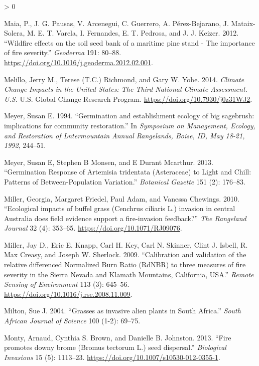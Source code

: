 \documentclass[
  12pt,
]{article}
\newlength{\cslhangindent}
\newenvironment{CSLReferences}[2] %
 {%
  \setlength{\parindent}{0pt}
  \ifodd #1 \everypar{\setlength{\hangindent}{\cslhangindent}}\ignorespaces\fi
  \ifnum #2 > 0
  \setlength{\parskip}{#2\baselineskip}
  \fi
 }%
 {}
\begin{document}
\begin{CSLReferences}{1}{0}
\leavevmode\hypertarget{ref-Maia2012}{}%
Maia, P., J. G. Pausas, V. Arcenegui, C. Guerrero, A. Pérez-Bejarano, J.
Mataix-Solera, M. E. T. Varela, I. Fernandes, E. T. Pedrosa, and J. J.
Keizer. 2012. {``{Wildfire effects on the soil seed bank of a maritime
pine stand - The importance of fire severity}.''} \emph{Geoderma} 191:
80--88. \url{https://doi.org/10.1016/j.geoderma.2012.02.001}.

\leavevmode\hypertarget{ref-Melillo2014}{}%
Melillo, Jerry M., Terese (T.C.) Richmond, and Gary W. Yohe. 2014.
\emph{Climate {Change} {Impacts} in the {United} {States}: {The} {Third}
{National} {Climate} {Assessment}. {U}.{S}.} U.S. Global Change Research
Program. \url{https://doi.org/10.7930/j0z31WJ2}.

\leavevmode\hypertarget{ref-Meyer1994}{}%
Meyer, Susan E. 1994. {``{Germination and establishment ecology of big
sagebrush: implications for community restoration}.''} In
\emph{Symposium on Management, Ecology, and Restoration of Lntermountain
Annual Rangelands, Boise, ID, May 18-21, 1992}, 244--51.

\leavevmode\hypertarget{ref-Meyer2013}{}%
Meyer, Susan E, Stephen B Monsen, and E Durant Mcarthur. 2013.
{``{Germination Response of Artemisia tridentata (Asteraceae) to Light
and Chill: Patterns of Between-Population Variation}.''} \emph{Botanical
Gazette} 151 (2): 176--83.

\leavevmode\hypertarget{ref-Miller2010}{}%
Miller, Georgia, Margaret Friedel, Paul Adam, and Vanessa Chewings.
2010. {``{Ecological impacts of buffel grass (Cenchrus ciliaris L.)
invasion in central Australia does field evidence support a
fire-invasion feedback?}''} \emph{The Rangeland Journal} 32 (4):
353--65. \url{https://doi.org/10.1071/RJ09076}.

\leavevmode\hypertarget{ref-Miller2009}{}%
Miller, Jay D., Eric E. Knapp, Carl H. Key, Carl N. Skinner, Clint J.
Isbell, R. Max Creasy, and Joseph W. Sherlock. 2009. {``{Calibration and
validation of the relative differenced Normalized Burn Ratio (RdNBR) to
three measures of fire severity in the Sierra Nevada and Klamath
Mountains, California, USA}.''} \emph{Remote Sensing of Environment} 113
(3): 645--56. \url{https://doi.org/10.1016/j.rse.2008.11.009}.

\leavevmode\hypertarget{ref-Milton2004}{}%
Milton, Sue J. 2004. {``{Grasses as invasive alien plants in South
Africa}.''} \emph{South African Journal of Science} 100 (1-2): 69--75.

\leavevmode\hypertarget{ref-Monty2013}{}%
Monty, Arnaud, Cynthia S. Brown, and Danielle B. Johnston. 2013.
{``{Fire promotes downy brome (Bromus tectorum L.) seed dispersal}.''}
\emph{Biological Invasions} 15 (5): 1113--23.
\url{https://doi.org/10.1007/s10530-012-0355-1}.


\end{CSLReferences}
\end{document}
